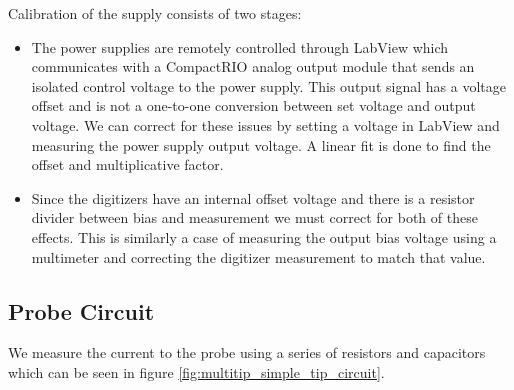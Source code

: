 Calibration of the supply consists of two stages:
\begin{itemize}
    \item The power supplies are remotely controlled through LabView which communicates with a CompactRIO analog output module that sends an isolated control voltage to the power supply. This output signal has a voltage offset and is not a one-to-one conversion between set voltage and output voltage. We can correct for these issues by setting a voltage in LabView and measuring the power supply output voltage. A linear fit is done to find the offset and multiplicative factor.
    \item Since the digitizers have an internal offset voltage and there is a resistor divider between bias and measurement we must correct for both of these effects. This is similarly a case of measuring the output bias voltage using a multimeter and correcting the digitizer measurement to match that value.
\end{itemize}

\subsection{Probe Circuit}
\label{sss:multitip_probe_circuit}

We measure the current to the probe using a series of resistors and capacitors which can be seen in figure \ref{fig:multitip_simple_tip_circuit}.

